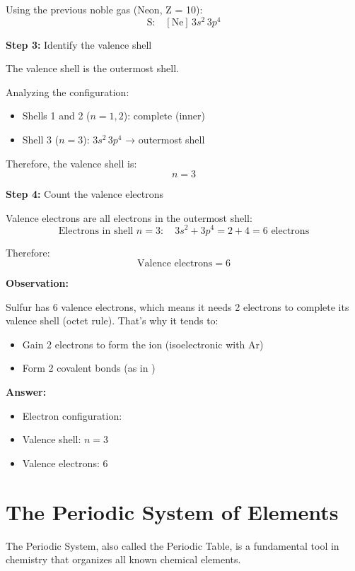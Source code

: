 \begin{exercise}
\begin{solu}
        Using the previous noble gas (Neon, Z = 10):
        \[
            \text{S:} \quad [\text{Ne}] \, 3s^2 \, 3p^4
        \]

        \textbf{Step 3:} Identify the valence shell

        The valence shell is the outermost shell.

        Analyzing the configuration:
        \begin{itemize}
            \item Shells 1 and 2 (\(n = 1, 2\)): complete (inner)
            \item Shell 3 (\(n = 3\)): \(3s^2 \, 3p^4\) → outermost shell
        \end{itemize}

        Therefore, the valence shell is:
        \[
            \boxed{n = 3}
        \]

        \textbf{Step 4:} Count the valence electrons

        Valence electrons are all electrons in the outermost shell:
        \[
            \text{Electrons in shell } n = 3: \quad 3s^2 + 3p^4 = 2 + 4 = 6 \text{ electrons}
        \]

        Therefore:
        \[
            \boxed{\text{Valence electrons} = 6}
        \]

        \textbf{Observation:}

        Sulfur has 6 valence electrons, which means it needs 2 electrons to complete its valence shell (octet rule). That's why it tends to:
        \begin{itemize}
            \item Gain 2 electrons to form the  ion (isoelectronic with Ar)
            \item Form 2 covalent bonds (as in )
        \end{itemize}

        \textbf{Answer:}
        \begin{itemize}
            \item Electron configuration: 
            \item Valence shell: \(n = 3\)
            \item Valence electrons: 6
        \end{itemize}
    \end{solu}
\end{exercise}
\section{The Periodic System of Elements}
The Periodic System, also called the Periodic Table, is a fundamental tool in chemistry that organizes all known chemical elements.

